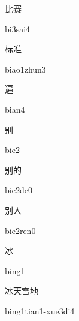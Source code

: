 \begin{verbete}[bi3sai4]{比赛}
\begin{pronuncia}{bi3sai4}
\end{pronuncia}
\end{verbete}

\begin{verbete}{标准}
\begin{pronuncia}{biao1zhun3}
\end{pronuncia}
\end{verbete}

\begin{verbete}[bian4]{遍}
\begin{pronuncia}{bian4}
\end{pronuncia}
\end{verbete}

\begin{verbete}[bie2]{别}
\begin{pronuncia}{bie2}
\end{pronuncia}
\end{verbete}

\begin{verbete}[bie2de0]{别的}
\begin{pronuncia}{bie2de0}
\end{pronuncia}
\end{verbete}

\begin{verbete}{别人}
\begin{pronuncia}{bie2ren0}
\end{pronuncia}
\end{verbete}

\begin{verbete}[bing1]{冰}
\begin{pronuncia}{bing1}
\end{pronuncia}
\end{verbete}

\begin{verbete}{冰天雪地}
\begin{pronuncia}{bing1tian1-xue3di4}
\end{pronuncia}
\end{verbete}

